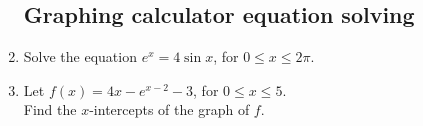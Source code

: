 \documentclass[12pt, oneside]{article}
\begin{document}
\begin{enumerate}
\subsection*{Graphing calculator equation solving}

\item Solve the equation $e^x = 4 \sin x$, for $0 \leq x \leq 2 \pi$.
    \begin{flushright}[5]\end{flushright}

\item Let $f(x)=4x - e^{x-2} -3$, for $0 \leq x \leq 5$.\\
    Find the $x$-intercepts of the graph of $f$.
    \begin{flushright}[3]\end{flushright}

\end{enumerate}
\end{document}
